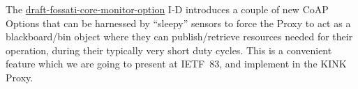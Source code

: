 The \href{https://github.com/koanlogic/webthings/blob/master/docs/draft-core-monitor-option/}{draft-fossati-core-monitor-option} I-D introduces a couple of new CoAP Options that can be harnessed by ``sleepy'' sensors to force the Proxy to act as a blackboard/bin object where they can publish/retrieve resources needed for their operation, during their typically very short duty cycles.  This is a convenient feature which we are going to present at \mbox{IETF 83}, and implement in the KINK Proxy.

